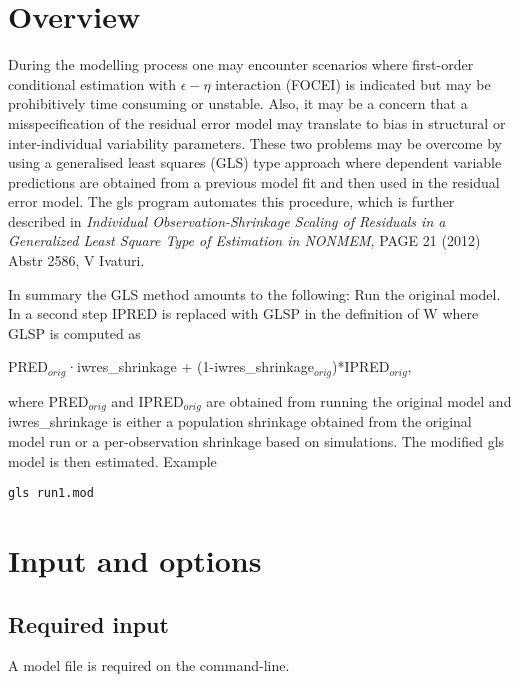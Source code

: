 



\maketitle


\section{Overview}
During the modelling process one may encounter scenarios where first-order conditional estimation with $\epsilon - \eta$ interaction (FOCEI) is indicated but may be prohibitively time consuming or unstable. Also, it may be a concern that a misspecification of the residual error model may translate to bias in structural or inter-individual variability parameters. These two problems may be overcome by using a generalised least squares (GLS) type approach where dependent variable predictions are obtained from a previous model fit and then used in the residual error model. The gls program automates this procedure, which is further described in \emph{Individual Observation-Shrinkage Scaling of Residuals in a Generalized Least Square Type of Estimation in NONMEM},
PAGE 21 (2012) Abstr 2586, V Ivaturi.

In summary the GLS method amounts to the following: Run the original model. In a second step IPRED is replaced with GLSP in the definition of W where GLSP is computed as 

PRED$_{orig}$·iwres\_shrinkage + (1-iwres\_shrinkage$_{orig}$)*IPRED$_{orig}$, 

where  PRED$_{orig}$ and IPRED$_{orig}$ are obtained from running the original model and iwres\_shrinkage is either a population shrinkage obtained from the original model run or a per-observation shrinkage based on simulations. The modified gls model is then estimated.
Example
\begin{verbatim}
gls run1.mod
\end{verbatim}

\section{Input and options}

\subsection{Required input}
A model file is required on the command-line.


